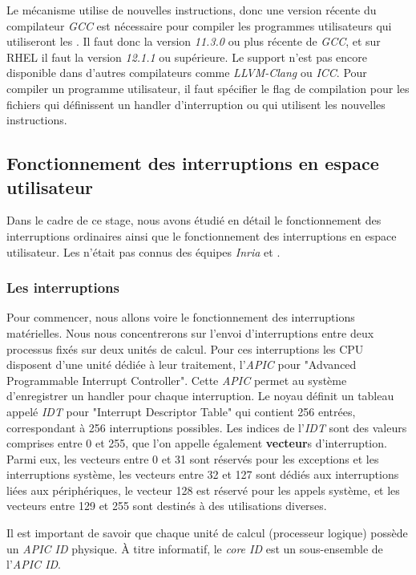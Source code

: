 Le mécanisme utilise de nouvelles instructions, donc une version récente du compilateur \emph{GCC} est nécessaire pour compiler les programmes utilisateurs qui utiliseront les \uintr{}.
Il faut donc la version \emph{11.3.0} ou plus récente de \emph{GCC}, et sur RHEL il faut la version \emph{12.1.1} ou supérieure.
Le support n'est pas encore disponible dans d'autres compilateurs comme \emph{LLVM-Clang} ou \emph{ICC}.
Pour compiler un programme utilisateur, il faut spécifier le flag de compilation  pour les fichiers qui définissent un handler d'interruption ou qui utilisent les nouvelles instructions.

\subsection{Fonctionnement des interruptions en espace utilisateur}
\label{sec:uintr}

Dans le cadre de ce stage, nous avons étudié en détail le fonctionnement des interruptions ordinaires ainsi que le fonctionnement des interruptions en espace utilisateur.
Les \uintr{} n'était pas connus des équipes \emph{Inria} et \atos{}.

\subsubsection{Les interruptions}
\label{sec:interrupts}


Pour commencer, nous allons voire le fonctionnement des interruptions matérielles.
Nous nous concentrerons sur l'envoi d'interruptions entre deux processus fixés sur deux unités de calcul.
Pour ces interruptions les CPU disposent d'une unité dédiée à leur traitement, l'\emph{APIC} pour "Advanced Programmable Interrupt Controller".
Cette \emph{APIC} permet au système d'enregistrer un handler pour chaque interruption.
Le noyau définit un tableau appelé \emph{IDT} pour "Interrupt Descriptor Table" qui contient 256 entrées, correspondant à 256 interruptions possibles.
Les indices de l'\emph{IDT} sont des valeurs comprises entre 0 et 255, que l'on appelle également \textbf{vecteur}s d'interruption.
Parmi eux, les vecteurs entre 0 et 31 sont réservés pour les exceptions et les interruptions système,
les vecteurs entre 32 et 127 sont dédiés aux interruptions liées aux périphériques,
le vecteur 128 est réservé pour les appels système,
et les vecteurs entre 129 et 255 sont destinés à des utilisations diverses.

Il est important de savoir que chaque unité de calcul (processeur logique) possède un \emph{APIC ID} physique.
À titre informatif, le \emph{core ID} est un sous-ensemble de l'\emph{APIC ID}.

